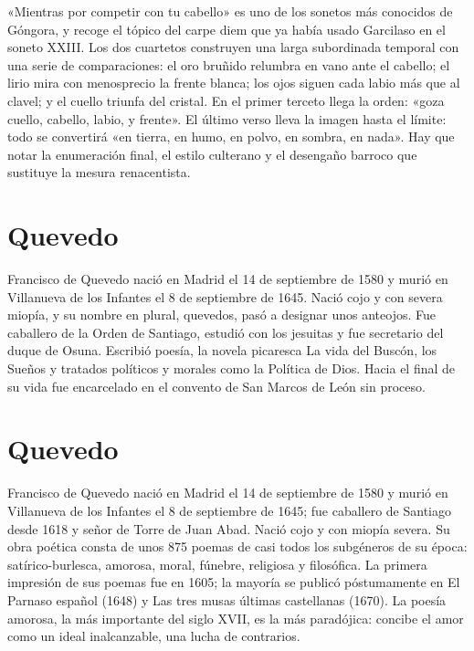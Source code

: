 \documentclass{book}
\begin{document}
«Mientras por competir con tu cabello» es uno de los sonetos más conocidos de Góngora, y recoge el tópico del carpe diem que ya había usado Garcilaso en el soneto XXIII. Los dos cuartetos construyen una larga subordinada temporal con una serie de comparaciones: el oro bruñido relumbra en vano ante el cabello; el lirio mira con menosprecio la frente blanca; los ojos siguen cada labio más que al clavel; y el cuello triunfa del cristal. En el primer terceto llega la orden: «goza cuello, cabello, labio, y frente». El último verso lleva la imagen hasta el límite: todo se convertirá «en tierra, en humo, en polvo, en sombra, en nada». Hay que notar la enumeración final, el estilo culterano y el desengaño barroco que sustituye la mesura renacentista.


\section{Quevedo}

Francisco de Quevedo nació en Madrid el 14 de septiembre de 1580 y murió en Villanueva de los Infantes el 8 de septiembre de 1645. Nació cojo y con severa miopía, y su nombre en plural, quevedos, pasó a designar unos anteojos. Fue caballero de la Orden de Santiago, estudió con los jesuitas y fue secretario del duque de Osuna. Escribió poesía, la novela picaresca La vida del Buscón, los Sueños y tratados políticos y morales como la Política de Dios. Hacia el final de su vida fue encarcelado en el convento de San Marcos de León sin proceso.


\section{Quevedo}

Francisco de Quevedo nació en Madrid el 14 de septiembre de 1580 y murió en Villanueva de los Infantes el 8 de septiembre de 1645; fue caballero de Santiago desde 1618 y señor de Torre de Juan Abad. Nació cojo y con miopía severa. Su obra poética consta de unos 875 poemas de casi todos los subgéneros de su época: satírico-burlesca, amorosa, moral, fúnebre, religiosa y filosófica. La primera impresión de sus poemas fue en 1605; la mayoría se publicó póstumamente en El Parnaso español (1648) y Las tres musas últimas castellanas (1670). La poesía amorosa, la más importante del siglo XVII, es la más paradójica: concibe el amor como un ideal inalcanzable, una lucha de contrarios.
\end{document}
